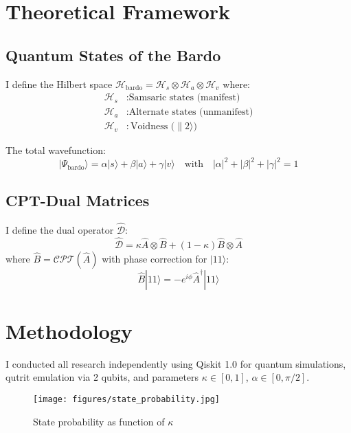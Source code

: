 \documentclass[12pt]{article}
\begin{document}
\section{Theoretical Framework}
\subsection{Quantum States of the Bardo}
I define the Hilbert space $\mathcal{H}_{\text{bardo}} = \mathcal{H}_s \otimes \mathcal{H}_a \otimes \mathcal{H}_v$ where:
\begin{align*}
\mathcal{H}_s &: \text{Samsaric states (manifest)} \\
\mathcal{H}_a &: \text{Alternate states (unmanifest)} \\
\mathcal{H}_v &: \text{Voidness (}\|2\rangle\text{)}
\end{align*}

The total wavefunction:
\begin{equation}
|\Psi_{\text{bardo}}\rangle = \alpha|s\rangle + \beta|a\rangle + \gamma|v\rangle \quad \text{with} \quad |\alpha|^2 + |\beta|^2 + |\gamma|^2 = 1
\end{equation}

\subsection{CPT-Dual Matrices}
I define the dual operator $\hat{\mathcal{D}}$:
\begin{equation}
\hat{\mathcal{D}} = \kappa \hat{A} \otimes \hat{B} + (1 - \kappa) \hat{B} \otimes \hat{A}
\end{equation}
where $\hat{B} = \mathcal{C}\mathcal{P}\mathcal{T}(\hat{A})$ with phase correction for $|11\rangle$:
\begin{equation}
\hat{B}|11\rangle = -e^{i\phi}\hat{A}^{\dagger}|11\rangle
\end{equation}

\section{Methodology}
I conducted all research independently using Qiskit 1.0 for quantum simulations, qutrit emulation via 2 qubits, and parameters $\kappa \in [0,1]$, $\alpha \in [0,\pi/2]$.

\begin{figure}[h]
\centering
\texttt{[image: figures/state\_probability.jpg]}
\caption{State probability as function of $\kappa$}
\label{fig:prob}
\end{figure}
\end{document}
